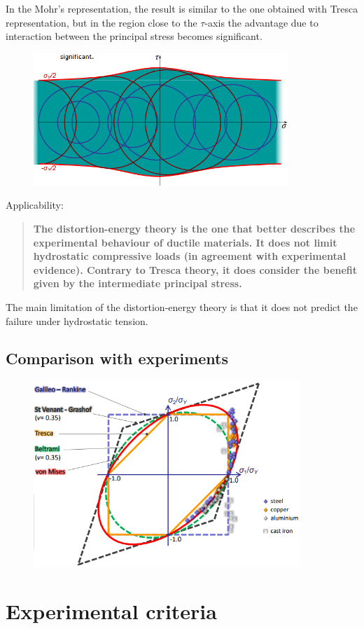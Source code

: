 \documentclass[class=report, crop=false, 12pt,a4paper]{standalone}
\begin{document}
In the Mohr's representation, the result is similar to the one obtained with Tresca representation, but in the region close to the $\tau$-axis the advantage due to interaction between the principal stress becomes significant.
\begin{figure}[H]
  \centering
  \includegraphics[height = 5cm]{../img/diagram96.png}
  \caption{}
\end{figure}
Applicability:
\begin{quotation}
  \textbf{The distortion-energy theory is the one that better describes the experimental behaviour of ductile materials. It does not limit hydrostatic compressive loads (in agreement with experimental evidence). Contrary to Tresca theory, it does consider the benefit given by the intermediate principal stress.}
\end{quotation}
The main limitation of the distortion-energy theory is that it does not predict the failure under hydrostatic tension.
\subsection{Comparison with experiments}
\begin{figure}[H]
  \centering
  \includegraphics[height = 7cm]{../img/diagram97.png}
  \caption{}
\end{figure}
\section{Experimental criteria}
\end{document}
